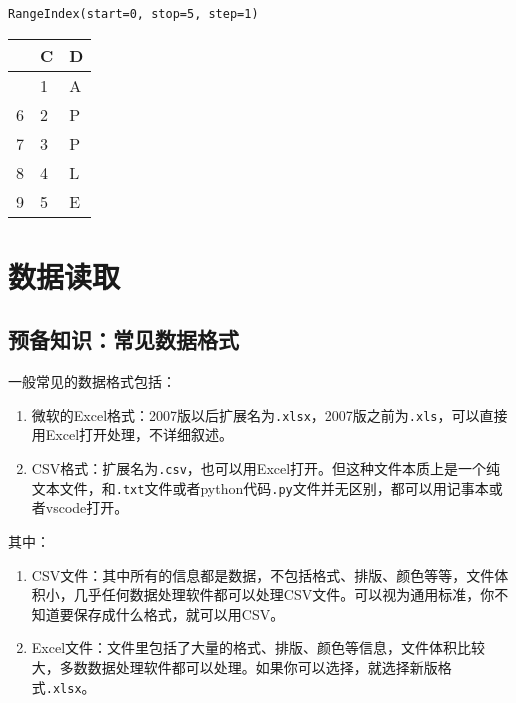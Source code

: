 \documentclass[
  letterpaper,
  DIV=11,
  numbers=noendperiod]{scrreprt}
\providecommand{\tightlist}{%
  \setlength{\itemsep}{0pt}\setlength{\parskip}{0pt}}\usepackage{longtable,booktabs,array}
\begin{document}
\begin{verbatim}
RangeIndex(start=0, stop=5, step=1)
\end{verbatim}

\begin{longtable}[]{@{}lll@{}}
\toprule\noalign{}
& C & D \\
\midrule\noalign{}
\endhead
\bottomrule\noalign{}
\endlastfoot
5 & 1 & A \\
6 & 2 & P \\
7 & 3 & P \\
8 & 4 & L \\
9 & 5 & E \\
\end{longtable}

\hypertarget{ux6570ux636eux8bfbux53d6}{%
\section{数据读取}\label{ux6570ux636eux8bfbux53d6}}

\hypertarget{ux9884ux5907ux77e5ux8bc6ux5e38ux89c1ux6570ux636eux683cux5f0f}{%
\subsection{预备知识：常见数据格式}\label{ux9884ux5907ux77e5ux8bc6ux5e38ux89c1ux6570ux636eux683cux5f0f}}

一般常见的数据格式包括：

\begin{enumerate}
\def\labelenumi{\arabic{enumi}.}
\tightlist
\item
  微软的Excel格式：2007版以后扩展名为\texttt{.xlsx}，2007版之前为\texttt{.xls}，可以直接用Excel打开处理，不详细叙述。
\item
  CSV格式：扩展名为\texttt{.csv}，也可以用Excel打开。但这种文件本质上是一个纯文本文件，和\texttt{.txt}文件或者python代码\texttt{.py}文件并无区别，都可以用记事本或者vscode打开。
\end{enumerate}

其中：

\begin{enumerate}
\def\labelenumi{\arabic{enumi}.}
\tightlist
\item
  CSV文件：其中所有的信息都是数据，不包括格式、排版、颜色等等，文件体积小，几乎任何数据处理软件都可以处理CSV文件。可以视为通用标准，你不知道要保存成什么格式，就可以用CSV。
\item
  Excel文件：文件里包括了大量的格式、排版、颜色等信息，文件体积比较大，多数数据处理软件都可以处理。如果你可以选择，就选择新版格式\texttt{.xlsx}。
\end{enumerate}
\end{document}
